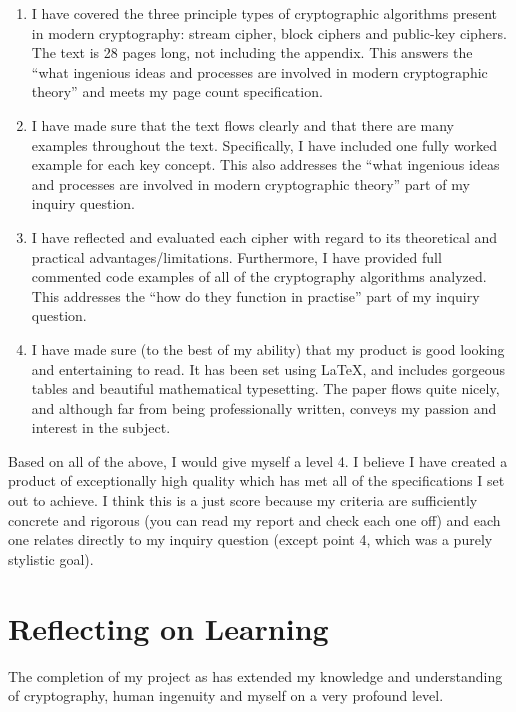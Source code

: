 \documentclass[12pt, a4paper, draft]{report}
\begin{document}
\begin{enumerate}
\item I have covered the three principle types of cryptographic algorithms
present in modern cryptography: stream cipher, block ciphers and public-key
ciphers. The text is 28 pages long, not including the appendix. This answers
the ``what ingenious ideas and processes are involved in modern cryptographic
theory'' and meets my page count specification.

\item I have made sure that the text flows clearly and that there are many
examples throughout the text. Specifically, I have included one fully worked
example for each key concept. This also addresses the ``what ingenious ideas
and processes are involved in modern cryptographic theory'' part of my inquiry
question.

\item I have reflected and evaluated each cipher with regard to its theoretical
and practical advantages/limitations. Furthermore, I have provided full commented
code examples of all of the cryptography algorithms analyzed. This addresses
the ``how do they function in practise'' part of my inquiry question.

\item I have made sure (to the best of my ability) that my product is good
looking and entertaining to read. It has been set using {\LaTeX}, and includes
gorgeous tables and beautiful mathematical typesetting. The paper flows quite
nicely, and although far from being professionally written, conveys my passion
and interest in the subject.
\end{enumerate}

Based on all of the above, I would give myself a level 4. I believe I have
created a product of exceptionally high quality which has met all of the
specifications I set out to achieve. I think this is a just score because my
criteria are sufficiently concrete and rigorous (you can read my report and
check each one off) and each one relates directly to my inquiry question
(except point 4, which was a purely stylistic goal).

\section*{Reflecting on Learning}

The completion of my project as has extended my knowledge and understanding of
cryptography, human ingenuity and myself on a very profound level.
\end{document}
